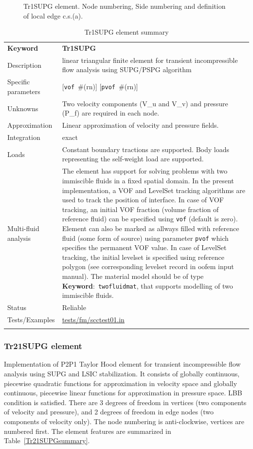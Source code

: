 \documentclass[a4paper]{article}
\newcommand{\descitem}[1]{{\noindent \textbf{#1}}:}
\newcommand{\elemkeyword}[1]{\descitem{Keyword}~\param{#1}} %
\newcommand{\param}[1]{\texttt{#1}} %
\newcommand{\optional}[1]{[#1]} %
\newcommand{\field}[2]{\param{#1}~\#{\tiny(#2)}} %
\newcommand{\optField}[2]{\optional{\field{#1}{#2}}}
\newcommand{\templabel}{}%
\newcommand{\tempcaption}{}%
\newcounter{nelpar}
\newenvironment{elementsummary}[5]{%
  \gdef\tempcaption{#4}%
  \gdef\templabel{#5}%
  \setcounter{nelpar}{0}%
  \begin{center} %
    \begin{table}[!htb] %
      \begin{tabular}{|l|p{9cm}|}\hline %
        {\bf Keyword} & \bf{#1}\\ %
        {Description} & {#2}\\ %
        {Specific parameters} & {#3}\\ \hline %
}{
  \\ \hline %
      \end{tabular}%
      \caption{\tempcaption}%
      \label{\templabel}%
    \end{table}%
  \end{center}%
}
\newcommand{\elementDescription}[2]{{#1} & {#2}\\}
\begin{document}
\begin{figure}[htb]
 \centering
 \begin{makeimage}
  
 \end{makeimage}
 \caption{Tr1SUPG element. Node numbering, Side numbering and
 definition of local edge c.s.(a).}
 \label{Tr1SUPG2fig}
\end{figure}

\begin{elementsummary}{Tr1SUPG}{linear triangular finite element for transient
incompressible flow analysis using SUPG/PSPG algorithm}{\optField{vof}{rn} \optField{pvof}{rn}}{Tr1SUPG element summary}{Tr1SUPGsummary}
\elementDescription{Unknowns}{Two velocity components (V\_u and V\_v) and pressure (P\_f) are required in each node.}
\elementDescription{Approximation}{Linear approximation of velocity and pressure fields.}
\elementDescription{Integration}{exact}
\elementDescription{Loads}{Constant boundary tractions are supported. Body loads
representing the self-weight load are supported.}
\elementDescription{Multi-fluid analysis}{The element has support for solving
problems with two immiscible fluids in
a fixed spatial domain. In the present implementation, a VOF and LevelSet tracking algorithms
are used to track the position of interface. In case of VOF tracking, an initial VOF fraction
(volume fraction of reference fluid) can be specified using
\param{vof} (default is zero). Element can also be marked as allways
filled with reference fluid (some form of source) using parameter
\param{pvof} which specifies the permanent VOF value. In case of LevelSet tracking, the initial levelset is specified using 
reference polygon (see corresponding levelset record in oofem input manual).
The material model should be of type \elemkeyword{twofluidmat}, that
supports modelling of two immiscible fluids.}
\elementDescription{Status}{Reliable}
\elementDescription{Tests/Examples}{\href{https://github.com/oofem/oofem/blob/devel/tests/fm/scctest01.in}{tests/fm/scctest01.in}
}
\end{elementsummary}


\subsubsection{Tr21SUPG element}
\label{Tr21SUPG}
Implementation of P2P1 Taylor Hood element for transient incompressible flow analysis 
using SUPG and LSIC stabilization. It consists of globally continuous, piecewise quadratic functions for 
approximation in velocity space and globally continuous, piecewise linear functions for
approximation in pressure space. LBB condition is satisfied. There are 3 degrees
of freedom in vertices (two components of velocity and pressure), and 2 degrees of freedom
in edge nodes (two components of velocity only).
The node numbering is anti-clockwise, vertices are numbered first. The element features are summarized in Table~\ref{Tr21SUPGsummary}.
\end{document}
